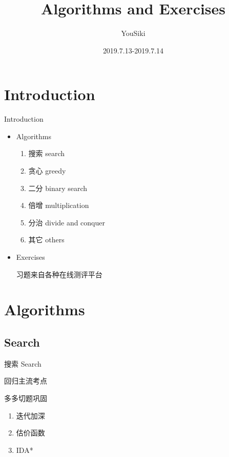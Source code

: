 \documentclass{beamer}
\title[Algorithms and Exercises]{Algorithms and Exercises}
\author{YouSiki}
\institute{Peking University}
\date{2019.7.13-2019.7.14}
\begin{document}
\begin{frame}
    \titlepage
\end{frame}

\section{Introduction}

\begin{frame}{Introduction}

    \begin{itemize}
        \item 
        Algorithms
        \begin{enumerate}
            \item 搜索 search
            \item 贪心 greedy
            \item 二分 binary search
            \item 倍增 multiplication
            \item 分治 divide and conquer
            \item 其它 others
        \end{enumerate}
        \item
        Exercises
        
        习题来自各种在线测评平台
    \end{itemize}

\end{frame}

\section{Algorithms}

\subsection{Search}

\begin{frame}{搜索 Search}

    回归主流考点
    
    多多切题巩固
    
    \begin{enumerate}
        \item 
        迭代加深
        \item
        估价函数
        \item
        IDA*
    \end{enumerate}
    
\end{frame}
\end{document}
